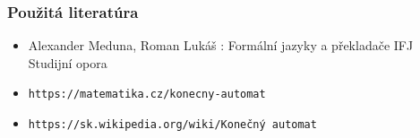 \documentclass{beamer}
\begin{document}
\begin{frame}
\frametitle{Použitá literatúra}
\begin{itemize}
\item{Alexander Meduna, Roman Lukáš : Formální jazyky a překladače IFJ Studijní opora }
\item{\texttt{https://matematika.cz/konecny-automat}}
\item{\texttt{https://sk.wikipedia.org/wiki/Konečný automat}}


\end{itemize}
\end{frame}
\end{document}
